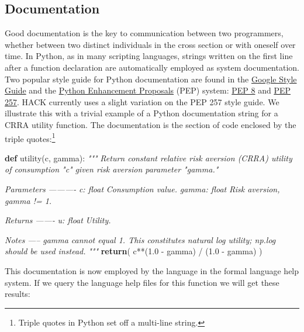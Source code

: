 \documentclass[]{article}
\newenvironment{Shaded}{}{}
\newcommand{\KeywordTok}[1]{\textcolor[rgb]{0.00,0.44,0.13}{\textbf{{#1}}}}
\newcommand{\FloatTok}[1]{\textcolor[rgb]{0.25,0.63,0.44}{{#1}}}
\newcommand{\CommentTok}[1]{\textcolor[rgb]{0.38,0.63,0.69}{\textit{{#1}}}}
\newcommand{\NormalTok}[1]{{#1}}
\begin{document}
\subsection{Documentation}\label{documentation}

Good documentation is the key to communication between two programmers,
whether between two distinct individuals in the cross section or with
oneself over time. In Python, as in many scripting languages, strings
written on the first line after a function declaration are automatically
employed as system documentation. Two popular style guide for Python
documentation are found in the
\href{http://google-styleguide.googlecode.com/svn/trunk/pyguide.html}{Google
Style Guide} and the \href{https://www.python.org/dev/peps/}{Python
Enhancement Proposals} (PEP) system:
\href{https://www.python.org/dev/peps/pep-0008/}{PEP 8} and
\href{https://www.python.org/dev/peps/pep-0257/}{PEP 257}. HACK
currently uses a slight variation on the PEP 257 style guide. We
illustrate this with a trivial example of a Python documentation string
for a CRRA utility function. The documentation is the section of code
enclosed by the triple quotes:\footnote{Triple quotes in Python set off
  a multi-line string.}

\begin{Shaded}
\begin{Highlighting}[]
\KeywordTok{def} \NormalTok{utility(c, gamma):}
    \CommentTok{"""}
\CommentTok{    Return constant relative risk aversion (CRRA) utility of consumption "c"}
\CommentTok{    given risk aversion parameter "gamma."}

\CommentTok{    Parameters}
\CommentTok{    ----------}
\CommentTok{    c: float}
\CommentTok{        Consumption value.}
\CommentTok{    gamma: float}
\CommentTok{        Risk aversion, gamma != 1.}

\CommentTok{    Returns}
\CommentTok{    -------}
\CommentTok{    u: float}
\CommentTok{        Utility.}

\CommentTok{    Notes}
\CommentTok{    -----}
\CommentTok{    gamma cannot equal 1. This constitutes natural log utility; np.log}
\CommentTok{    should be used instead.}
\CommentTok{    """}
    \KeywordTok{return}\NormalTok{( c**(}\FloatTok{1.0} \NormalTok{- gamma) / (}\FloatTok{1.0} \NormalTok{- gamma) )}
\end{Highlighting}
\end{Shaded}

This documentation is now employed by the language in the formal
language help system. If we query the language help files for this
function we will get these results:
\end{document}
